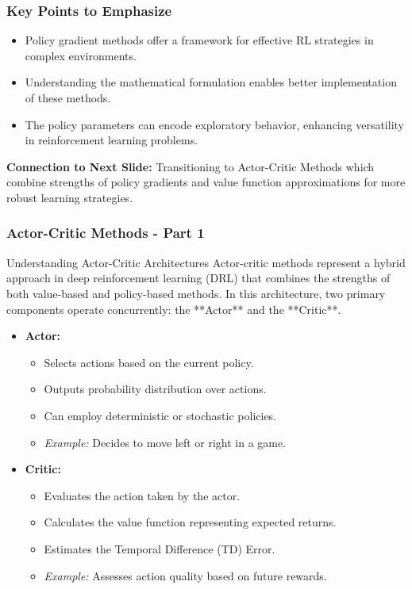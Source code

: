 \documentclass[aspectratio=169]{beamer}
\begin{document}
\begin{frame}
    \frametitle{Key Points to Emphasize}
    \begin{itemize}
        \item Policy gradient methods offer a framework for effective RL strategies in complex environments.
        
        \item Understanding the mathematical formulation enables better implementation of these methods.
        
        \item The policy parameters can encode exploratory behavior, enhancing versatility in reinforcement learning problems.
    \end{itemize}
    \vfill
    \textbf{Connection to Next Slide:} Transitioning to Actor-Critic Methods which combine strengths of policy gradients and value function approximations for more robust learning strategies.
\end{frame}

\begin{frame}[fragile]
    \frametitle{Actor-Critic Methods - Part 1}
    \begin{block}{Understanding Actor-Critic Architectures}
        Actor-critic methods represent a hybrid approach in deep reinforcement learning (DRL) that combines the strengths of both value-based and policy-based methods. In this architecture, two primary components operate concurrently: the **Actor** and the **Critic**.
    \end{block}
    
    \begin{itemize}
        \item \textbf{Actor:}
        \begin{itemize}
            \item Selects actions based on the current policy.
            \item Outputs probability distribution over actions.
            \item Can employ deterministic or stochastic policies.
            \item \textit{Example:} Decides to move left or right in a game.
        \end{itemize}
        
        \item \textbf{Critic:}
        \begin{itemize}
            \item Evaluates the action taken by the actor.
            \item Calculates the value function representing expected returns.
            \item Estimates the Temporal Difference (TD) Error.
            \item \textit{Example:} Assesses action quality based on future rewards.
        \end{itemize}
    \end{itemize}
\end{frame}
\end{document}
